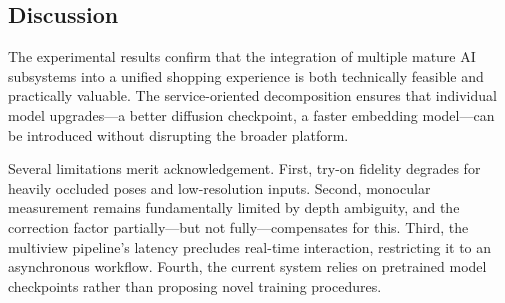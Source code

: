 \subsection{Discussion}

The experimental results confirm that the integration of multiple mature AI subsystems into a unified shopping experience is both technically feasible and practically valuable. The service-oriented decomposition ensures that individual model upgrades---a better diffusion checkpoint, a faster embedding model---can be introduced without disrupting the broader platform.

Several limitations merit acknowledgement. First, try-on fidelity degrades for heavily occluded poses and low-resolution inputs. Second, monocular measurement remains fundamentally limited by depth ambiguity, and the correction factor partially---but not fully---compensates for this. Third, the multiview pipeline's latency precludes real-time interaction, restricting it to an asynchronous workflow. Fourth, the current system relies on pretrained model checkpoints rather than proposing novel training procedures.

